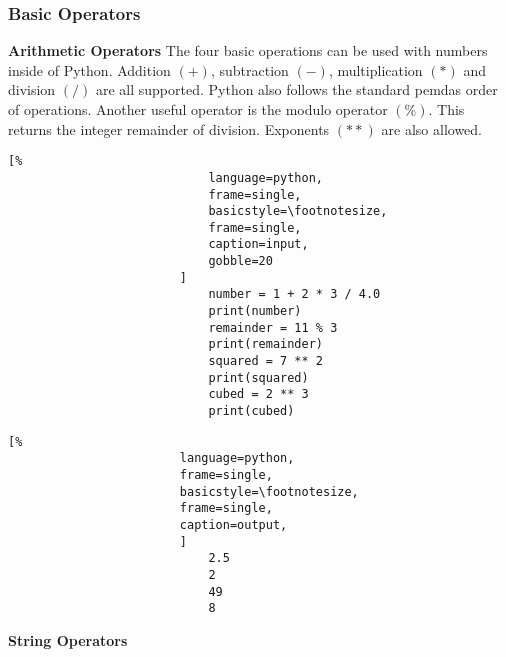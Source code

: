 \documentclass[crop=false,class=book,oneside]{standalone}
\begin{document}
            \subsubsection{Basic Operators}
                \textbf{Arithmetic Operators}
                    The four basic operations can be used with numbers
                    inside of Python. Addition $(+)$, subtraction $(-)$,
                    multiplication $(*)$ and division $(/)$ are all
                    supported. Python also follows the standard
                    \gls{pemdas} order of operations. Another useful
                    operator is the modulo operator $(\%)$. This returns
                    the integer remainder of division. Exponents $(**)$
                    are also allowed.\newline
                    \begin{minipage}[t]{.48\textwidth}
                        \centering
                        \begin{lstlisting}[%
                            language=python,
                            frame=single,
                            basicstyle=\footnotesize,
                            frame=single,
                            caption=input,
                            gobble=20
                        ]
                            number = 1 + 2 * 3 / 4.0
                            print(number)
                            remainder = 11 % 3
                            print(remainder)
                            squared = 7 ** 2
                            print(squared)
                            cubed = 2 ** 3
                            print(cubed)
                        \end{lstlisting}
                    \end{minipage}\hfill
                    \begin{minipage}[t]{.48\textwidth}
                        \centering
                        \begin{lstlisting}[%
                        language=python,
                        frame=single,
                        basicstyle=\footnotesize,
                        frame=single,
                        caption=output,
                        ]
                            2.5
                            2
                            49
                            8
                        \end{lstlisting}
                    \end{minipage}
                \textbf{String Operators}
\end{document}
